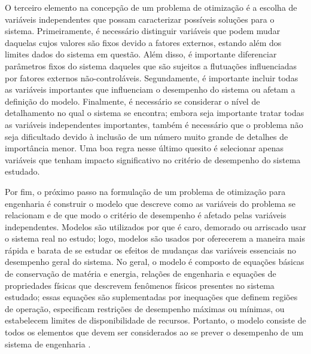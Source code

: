 O terceiro elemento na concep\c{c}\~{a}o de um problema de otimiza\c{c}\~{a}o \'{e} a escolha de vari\'{a}veis independentes que possam caracterizar poss\'{i}veis solu\c{c}\~{o}es para o sistema. Primeiramente, \'{e} necess\'{a}rio distinguir vari\'{a}veis que podem mudar daquelas cujos valores s\~{a}o fixos devido a fatores externos, estando al\'{e}m dos limites dados do sistema em quest\~{a}o. Al\'{e}m disso, \'{e} importante diferenciar par\^{a}metros fixos do sistema daqueles que s\~{a}o sujeitos a flutua\c{c}\~{o}es influenciadas por fatores externos n\~{a}o-control\'{a}veis. Segundamente, \'{e} importante incluir todas as vari\'{a}veis importantes que influenciam o desempenho do sistema ou afetam a defini\c{c}\~{a}o do modelo. Finalmente, \'{e} necess\'{a}rio se considerar o n\'{i}vel de detalhamento no qual o sistema se encontra; embora seja importante tratar todas as vari\'{a}veis independentes importantes, tamb\'{e}m \'{e} necess\'{a}rio que o problema n\~{a}o seja dificultado devido \`{a} inclus\~{a}o de um n\'{u}mero muito grande de detalhes de import\^{a}ncia menor. Uma boa regra nesse \'{u}ltimo quesito \'{e} selecionar apenas vari\'{a}veis que tenham impacto significativo no crit\'{e}rio de desempenho do sistema estudado.

Por fim, o pr\'{o}ximo passo na formula\c{c}\~{a}o de um problema de otimiza\c{c}\~{a}o para engenharia \'{e} construir o modelo que descreve como as vari\'{a}veis do problema se relacionam e de que modo o crit\'{e}rio de desempenho \'{e} afetado pelas vari\'{a}veis independentes. Modelos s\~{a}o utilizados por que \'{e} caro, demorado ou arriscado usar o sistema real no estudo; logo, modelos s\~{a}o usados por oferecerem a maneira mais r\'{a}pida e barata de se estudar os efeitos de mudan\c{c}as das vari\'{a}veis essenciais no desempenho geral do sistema. No geral, o modelo \'{e} composto de equa\c{c}\~{o}es b\'{a}sicas de conserva\c{c}\~{a}o de mat\'{e}ria e energia, rela\c{c}\~{o}es de engenharia e equa\c{c}\~{o}es de propriedades f\'{i}sicas que descrevem fen\^{o}menos f\'{i}sicos presentes no sistema estudado; essas equa\c{c}\~{o}es s\~{a}o suplementadas por inequa\c{c}\~{o}es que definem regi\~{o}es de opera\c{c}\~{a}o, especificam restri\c{c}\~{o}es de desempenho m\'{a}ximas ou m\'{i}nimas, ou estabelecem limites de disponibilidade de recursos. Portanto, o modelo consiste de todos os elementos que devem ser considerados ao se prever o desempenho de um sistema de engenharia \cite{reklaitis}.